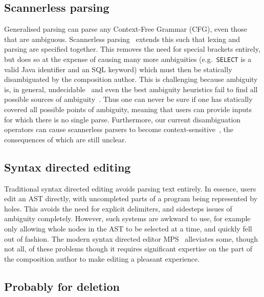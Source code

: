 \documentclass[sigplan,screen]{acmart}\settopmatter{printfolios=true,printccs=false,printacmref=false}
\begin{document}
\subsection{Scannerless parsing}

Generalised parsing can parse any Context-Free Grammar (CFG), even those that
are ambiguous. Scannerless parsing~\cite{visser97scannerless} extends this such
that lexing and parsing are specified together. This removes the need for
special brackets entirely, but does so at the expense of causing many more
ambiguities (e.g.~\texttt{SELECT} is a valid Java identifier and an SQL
keyword) which must then be statically disambiguated by the composition author.
This is challenging because ambiguity is, in general,
undecidable~\cite{cantor62ambiguity} and even the best ambiguity heuristics fail
to find all possible sources of ambiguity~\cite{vasudevan13detecting}. Thus one
can never be sure if one has statically covered all possible points of
ambiguity, meaning that users can provide inputs for which there is no single
parse.  Furthermore, our current disambiguation operators can cause scannerless
parsers to become context-sensitive~\cite{eijck__lets_accept_rejects}, the
consequences of which are still unclear.


\subsection{Syntax directed editing}

Traditional syntax directed editing avoids parsing text entirely. In essence,
users edit an AST directly, with uncompleted parts of a program being
represented by holes. This avoids the need for explicit delimiters, and
sidesteps issues of ambiguity completely. However, such systems are awkward to
use, for example only allowing whole nodes in the AST to be selected at a time,
and quickly fell out of fashion. The modern syntax directed editor
MPS~\cite{pech13mps} alleviates some, though not all, of these problems though
it requires significant expertise on the part of the composition author to make
editing a pleasant experience.



\subsection{Probably for deletion}
\end{document}
